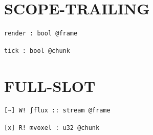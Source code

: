 \documentclass[11pt]{article}
\begin{document}
\section{SCOPE-TRAILING}\label{sec:scope-trailing}
\begin{lstlisting}[language=csl]
render : bool @frame
\end{lstlisting}
\begin{lstlisting}[language=csl]
tick : bool @chunk
\end{lstlisting}
\section{FULL-SLOT}\label{sec:full-slot}
\begin{lstlisting}[language=csl]
[~] W! ∫flux :: stream @frame
\end{lstlisting}
\begin{lstlisting}[language=csl]
[x] R! ⊞voxel : u32 @chunk
\end{lstlisting}
\end{document}

